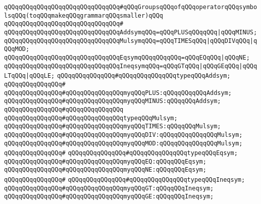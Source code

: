 \verb|qQQqqQQqqQQqqQQqqQQqqQQqqQQqqQQq#qQQqGroupsqQQqofqQQqoperatorqQQqsymbolsqQQq(toqQQqmakeqQQqgrammarqQQqsmaller)qQQq|\newline
\verb|qQQqqQQqqQQqqQQqqQQqqQQqqQQqqQQq#|\newline
\verb|qQQqqQQqqQQqqQQqqQQqqQQqqQQqqQQqAddsymqQQq=qQQqPLUSqQQqqQQq|\verb#|qQQqMINUS;#\newline
\verb|qQQqqQQqqQQqqQQqqQQqqQQqqQQqqQQqMulsymqQQq=qQQqTIMESqQQq|\verb#|qQQqDIVqQQq|qQQqMOD;#\newline
\newline
\verb|qQQqqQQqqQQqqQQqqQQqqQQqqQQqqQQqEqsymqQQqqQQqqQQq=qQQqEQqQQq|\verb#|qQQqNE;#\newline
\verb|qQQqqQQqqQQqqQQqqQQqqQQqqQQqqQQqIneqsymqQQq=qQQqGTqQQq|\verb#|qQQqGEqQQq|qQQqLTqQQq|qQQqLE;#\newline
\newline
\verb|qQQqqQQqqQQqqQQq#qQQqqQQqqQQqqQQqtypeqQQqAddsym;|\newline
\verb|qQQqqQQqqQQqqQQq#|\newline
\verb|qQQqqQQqqQQqqQQq#qQQqqQQqqQQqqQQqmyqQQqPLUS:qQQqqQQqqQQqAddsym;|\newline
\verb|qQQqqQQqqQQqqQQq#qQQqqQQqqQQqqQQqmyqQQqMINUS:qQQqqQQqAddsym;|\newline
\verb|qQQqqQQqqQQqqQQq#qQQqqQQqqQQqqQQq|\newline
\verb|qQQqqQQqqQQqqQQq#qQQqqQQqqQQqqQQqtypeqQQqMulsym;|\newline
\verb|qQQqqQQqqQQqqQQq#qQQqqQQqqQQqqQQqmyqQQqTIMES:qQQqqQQqMulsym;|\newline
\verb|qQQqqQQqqQQqqQQq#qQQqqQQqqQQqqQQqmyqQQqDIV:qQQqqQQqqQQqqQQqMulsym;|\newline
\verb|qQQqqQQqqQQqqQQq#qQQqqQQqqQQqqQQqmyqQQqMOD:qQQqqQQqqQQqqQQqMulsym;|\newline
\verb|qQQqqQQqqQQqqQQq#|\newline
\verb|qQQqqQQqqQQqqQQq#qQQqqQQqqQQqqQQqtypeqQQqEqsym;|\newline
\verb|qQQqqQQqqQQqqQQq#qQQqqQQqqQQqqQQqmyqQQqEQ:qQQqqQQqEqsym;|\newline
\verb|qQQqqQQqqQQqqQQq#qQQqqQQqqQQqqQQqmyqQQqNE:qQQqqQQqEqsym;|\newline
\verb|qQQqqQQqqQQqqQQq#|\newline
\verb|qQQqqQQqqQQqqQQq#qQQqqQQqqQQqqQQqtypeqQQqIneqsym;|\newline
\verb|qQQqqQQqqQQqqQQq#qQQqqQQqqQQqqQQqmyqQQqGT:qQQqqQQqIneqsym;|\newline
\verb|qQQqqQQqqQQqqQQq#qQQqqQQqqQQqqQQqmyqQQqGE:qQQqqQQqIneqsym;|\newline
